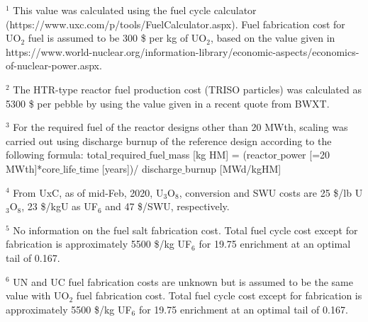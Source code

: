 \begin{landscape}
\begin{table} [ht]
\begin{center}
\begin{tabular}{|l|l|l|l|l|l|}
\end{tabular}
\end{center}

$^1$ This value was calculated using the fuel cycle calculator (https://www.uxc.com/p/tools/FuelCalculator.aspx). Fuel fabrication cost for UO$_2$ fuel is assumed to be 300 \$ per kg of UO$_2$, based on the value given in https://www.world-nuclear.org/information-library/economic-aspects/economics-of-nuclear-power.aspx. 

$^2$ The HTR-type reactor fuel production cost (TRISO particles) was calculated as 5300 \$ per pebble by using the value given in a recent quote from BWXT.

$^3$ For the required fuel of the reactor designs other than 20 MWth, scaling was carried out using discharge burnup of the reference design according to the following formula:
total$\_$required$\_$fuel$\_$mass [kg HM] = (reactor$\_$power [=20 MWth]*core$\_$life$\_$time [years])/ discharge$\_$burnup [MWd/kgHM]

$^4$ From UxC, as of mid-Feb, 2020, U$_3$O$_8$, conversion and SWU costs are 25 \$/lb U$_3$O$_8$, 23 \$/kgU as UF$_6$ and 47 \$/SWU, respectively. 

$^5$ No information on the fuel salt fabrication cost. Total fuel cycle cost except for fabrication is approximately 5500 \$/kg UF$_6$ for 19.75 enrichment at an optimal tail of 0.167. 

$^6$ UN and UC fuel fabrication costs are unknown but is assumed to be the same value with UO$_2$ fuel fabrication cost. Total fuel cycle cost except for fabrication is approximately 5500 \$/kg UF$_6$ for 19.75 enrichment at an optimal tail of 0.167. 

\end{table}
\end{landscape}

\restoregeometry
\pagebreak

